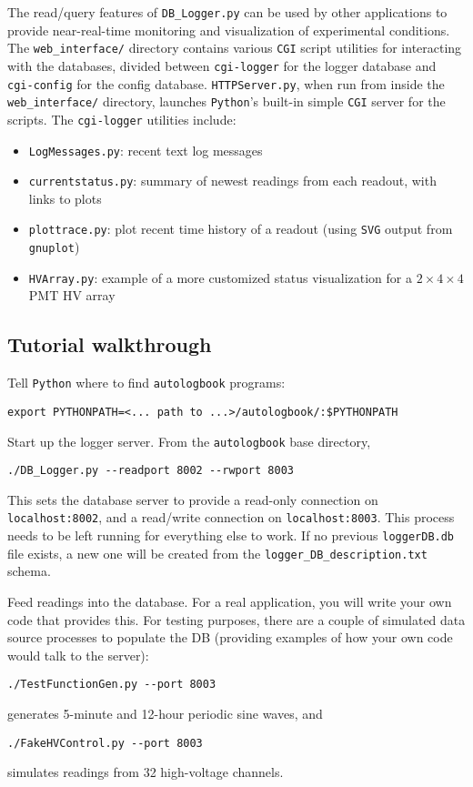 \documentclass[12pt,english]{article}
\newcommand{\cd}[1]{\texttt{#1}}
\begin{document}
The read/query features of \cd{DB\_Logger.py} can be used by other applications to provide
	near-real-time monitoring and visualization of experimental conditions.
The \cd{web\_interface/} directory contains various \cd{CGI} script utilities for
	interacting with the databases, divided between \cd{cgi-logger} for the logger database
	and \cd{cgi-config} for the config database.
\cd{HTTPServer.py}, when run from inside the \cd{web\_interface/} directory,
	launches \cd{Python}'s built-in simple \cd{CGI} server for the scripts.
The \cd{cgi-logger} utilities include:
\begin{itemize}
	\item \cd{LogMessages.py}: recent text log messages
	\item \cd{currentstatus.py}: summary of newest readings from each readout, with links to plots
	\item \cd{plottrace.py}: plot recent time history of a readout (using \cd{SVG} output from \cd{gnuplot})
	\item \cd{HVArray.py}: example of a more customized status visualization for a $2\times4\times4$ PMT HV array
\end{itemize}

%
%
\subsection{Tutorial walkthrough}

Tell \cd{Python} where to find \cd{autologbook} programs:
\begin{verbatim}
export PYTHONPATH=<... path to ...>/autologbook/:$PYTHONPATH
\end{verbatim}
Start up the logger server.
From the \cd{autologbook} base directory,
\begin{verbatim}
./DB_Logger.py --readport 8002 --rwport 8003
\end{verbatim}
This sets the database server to provide a read-only connection on \cd{localhost:8002},
	and a read/write connection on \cd{localhost:8003}.
This process needs to be left running for everything else to work.
If no previous \cd{loggerDB.db} file exists,
	a new one will be created from the \cd{logger\_DB\_description.txt} schema.

Feed readings into the database.
For a real application, you will write your own code that provides this.
For testing purposes, there are a couple of simulated data source processes to populate the DB
	(providing examples of how your own code would talk to the server):
\begin{verbatim}
./TestFunctionGen.py --port 8003
\end{verbatim}
generates 5-minute and 12-hour periodic sine waves, and
\begin{verbatim}
./FakeHVControl.py --port 8003
\end{verbatim}
simulates readings from 32 high-voltage channels.
\end{document}
